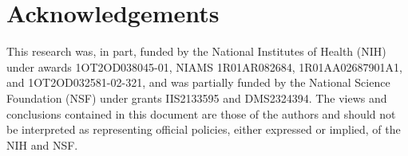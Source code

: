 \section*{Acknowledgements}
This research was, in part, funded by the National Institutes of Health (NIH) under awards 1OT2OD038045-01, NIAMS 1R01AR082684, 1R01AA02687901A1, and 1OT2OD032581-02-321, and was partially funded by the National Science Foundation (NSF) under grants IIS2133595 and DMS2324394. The views and conclusions contained in this document are those of the authors and should not be interpreted as representing official policies, either expressed or implied, of the NIH and NSF.